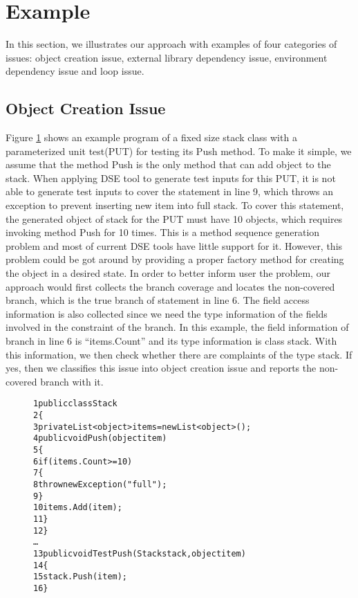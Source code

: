 \section{Example}
In this section, we illustrates our approach with examples of four categories of issues: object creation issue, external library dependency issue, environment dependency issue and loop issue. 
\subsection{Object Creation Issue}
Figure \ref{fig:obj} shows an example program of a fixed size stack class with a parameterized unit test(PUT)\cite{PUT} for testing its Push method. To make it simple, we assume that the method Push is the only method that can add object to the stack. When applying DSE tool to generate test inputs for this PUT, it is not able to generate test inputs to cover the statement in line 9, which throws an exception to prevent inserting new item into full stack. To cover this statement, the generated object of stack for the PUT must have 10 objects, which requires invoking method Push for 10 times. This is a method sequence generation problem and most of current DSE tools have little support for it. However, this problem could be got around by providing a proper factory method\cite{HalleuxT08} for creating the object in a desired state. In order to better inform user the problem, our approach would first collects the branch coverage and locates the non-covered branch, which is the true branch of statement in line 6. The field access information is also collected since we need the type information of the fields involved in the constraint of the branch. In this example, the field information of branch in line 6 is ``items.Count'' and its type information is class stack. With this information, we then check whether there are complaints of the type stack. If yes, then we classifies this issue into object creation issue and reports the non-covered branch with it. 
\begin{figure}
\begin{CodeOut}
\begin{alltt}
1    public class Stack
2    \{
3        private List<object> items = new List<object>();
4        public void Push(object item)
5       \{
6           if (items.Count >= 10)
7          \{
8              throw new Exception("full");
9          \}
10          items.Add(item);
11      \}
12   \}
     \ldots
13   public void TestPush(Stack stack,object item )
14   \{
15       stack.Push(item);            
16   \}
\end{alltt}
\end{CodeOut}
\label{fig:obj}
\end{figure}
